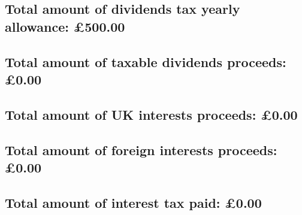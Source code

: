 \documentclass{article}
\begin{document}
\subsection*{Total amount of dividends tax yearly allowance: £500.00}
\subsection*{Total amount of taxable dividends proceeds: £0.00}
\subsection*{Total amount of UK interests proceeds: £0.00}
\subsection*{Total amount of foreign interests proceeds: £0.00}
\subsection*{Total amount of interest tax paid: £0.00}
\end{document}
